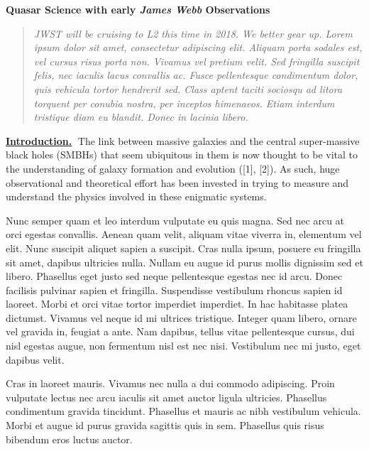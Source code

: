 \documentclass[11pt,epsf]{article}
\begin{document}
\vspace{-44pt} 
\begin{center}
  {\Large \bf Quasar Science with early {\it James Webb} Observations}
\end{center}

\begin{quotation}
\noindent
{\it  JWST will be cruising to L2 this time in 2018. We better gear up. 
Lorem ipsum dolor sit amet, consectetur adipiscing elit. Aliquam porta
sodales est, vel cursus risus porta non. Vivamus vel pretium
velit. Sed fringilla suscipit felis, nec iaculis lacus convallis
ac. Fusce pellentesque condimentum dolor, quis vehicula tortor
hendrerit sed. Class aptent taciti sociosqu ad litora torquent per
conubia nostra, per inceptos himenaeos. Etiam interdum tristique diam
eu blandit. Donec in lacinia libero.}
\noindent
\end{quotation}

\smallskip
\smallskip
\noindent
{\bf \underline{Introduction.}$\;$}
The link between massive galaxies and the central super-massive black
holes (SMBHs) that seem ubiquitous in them is now thought to be vital
to the understanding of galaxy formation and evolution ([1], [2]).  As
such, huge observational and theoretical effort has been invested in
trying to measure and understand the physics involved in these
enigmatic systems. 

\smallskip
\smallskip
\noindent
Nunc semper quam et leo interdum vulputate eu quis magna. Sed nec arcu
at orci egestas convallis. Aenean quam velit, aliquam vitae viverra
in, elementum vel elit. Nunc suscipit aliquet sapien a suscipit. Cras
nulla ipsum, posuere eu fringilla sit amet, dapibus ultricies
nulla. Nullam eu augue id purus mollis dignissim sed et
libero. Phasellus eget justo sed neque pellentesque egestas nec id
arcu. Donec facilisis pulvinar sapien et fringilla. Suspendisse
vestibulum rhoncus sapien id laoreet. Morbi et orci vitae tortor
imperdiet imperdiet. In hac habitasse platea dictumst. Vivamus vel
neque id mi ultrices tristique. Integer quam libero, ornare vel
gravida in, feugiat a ante. Nam dapibus, tellus vitae pellentesque
cursus, dui nisl egestas augue, non fermentum nisl est nec
nisi. Vestibulum nec mi justo, eget dapibus velit.

\smallskip
\smallskip
\noindent
Cras in laoreet mauris. Vivamus nec nulla a dui commodo
adipiscing. Proin vulputate lectus nec arcu iaculis sit amet auctor
ligula ultricies. Phasellus condimentum gravida tincidunt. Phasellus
et mauris ac nibh vestibulum vehicula. Morbi et augue id purus gravida
sagittis quis in sem. Phasellus quis risus bibendum eros luctus
auctor.
\end{document}

